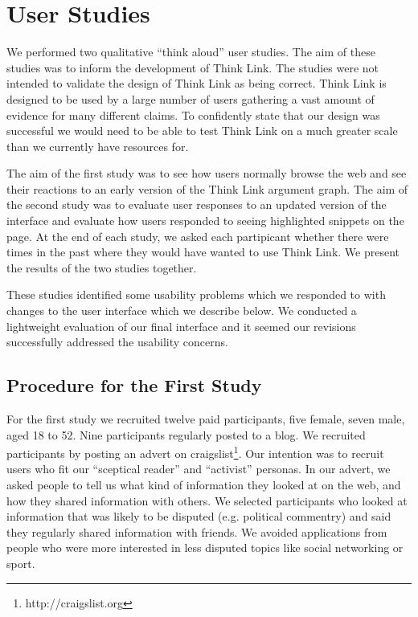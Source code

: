 \documentclass{chi2009}
\newcommand{\todo}[1]{}
\begin{document}
\section{User Studies}

We performed two qualitative ``think aloud'' user studies. The aim of these studies was to inform the development of Think Link. The studies were not intended to validate the design of Think Link as being correct. Think Link is designed to be used by a large number of users gathering a vast amount of evidence for many different claims. To confidently state that our design was successful we would need to be able to test Think Link on a much greater scale than we currently have resources for.

The aim of the first study was to see how users normally browse the web and see their reactions to an early version of the Think Link argument graph. The aim of the second study was to evaluate user responses to an updated version of the interface and evaluate how users responded to seeing highlighted snippets on the page. At the end of each study, we asked each partipicant whether there were times in the past where they would have wanted to use Think Link. We present the results of the two studies together.

These studies identified some usability problems which we responded to with changes to the user interface which we describe below. We conducted a lightweight evaluation of our final interface and it seemed our revisions successfully addressed the usability concerns.

\todo{Test with at least 4 people}
\todo{Say something about final informal evaluation}


\subsection{Procedure for the First Study}

For the first study we recruited twelve paid participants, five female, seven male, aged 18 to 52. Nine participants regularly posted to a blog. We recruited participants by posting an advert on craigslist\footnote{http://craigslist.org}.
Our intention was to recruit users who fit our ``sceptical reader'' and ``activist'' personas. In our advert, we asked people to tell us what kind of information they looked at on the web, and how they shared information with others. We selected participants who looked at information that was likely to be disputed (e.g. political commentry) and said they regularly shared information with friends. We avoided applications from people who were more interested in less disputed topics like social networking or sport.
\end{document}
